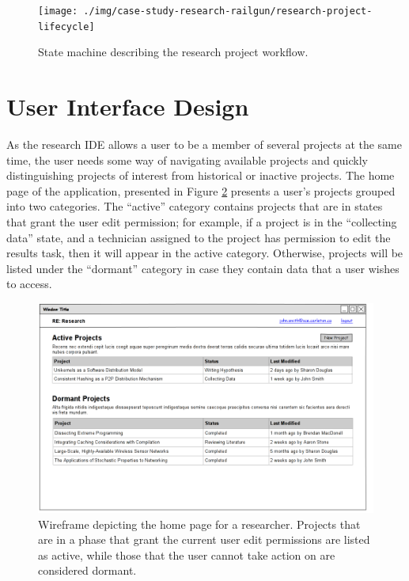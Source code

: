 \documentclass[document.tex]{subfiles}
\begin{document}
\begin{figure}[!ht]
\centering \texttt{[image: ./img/case-study-research-railgun/research-project-lifecycle]}
\caption{State machine describing the research project workflow.}
\label{fig:case-research-design-project-workflow}
\end{figure}

\FloatBarrier

\section {User Interface Design}
\label {sec:case-research-ui-design}


As the research IDE allows a user to be a member of several projects at the same time, the user needs some way of navigating available projects and quickly distinguishing projects of interest from historical or inactive projects. The home page of the application, presented in Figure \ref{fig:case-research-design-home-page} presents a user's projects grouped into two categories. The ``active'' category contains projects that are in states that grant the user edit permission; for example, if a project is in the ``collecting data'' state, and a technician assigned to the project has permission to edit the results task, then it will appear in the active category. Otherwise, projects will be listed under the ``dormant'' category in case they contain data that a user wishes to access.

\begin{figure}[!ht]
\centering \includegraphics[width=5.5in]{./img/case-study-research-railgun/mockup-home-page}
\caption{Wireframe depicting the home page for a researcher. Projects that are in a phase that grant the current user edit permissions are listed as active, while those that the user cannot take action on are considered dormant.}
\label{fig:case-research-design-home-page}
\end{figure}
\end{document}
